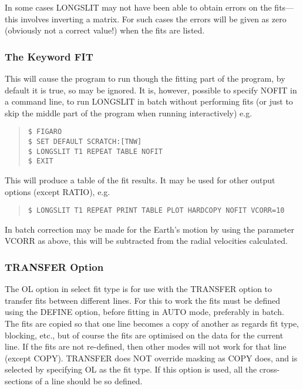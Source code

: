 In some cases LONGSLIT may not have been able to obtain errors on the
fits---this involves inverting a matrix.
For such cases the errors will be given as zero (obviously not a correct
value!) when the fits are listed.

\subsubsection{The Keyword FIT}
\label{long.fit}

This will cause the program to run though the fitting part of the
program, by default it is true, so may be ignored. It is, however,
possible to specify NOFIT in a command line, to run LONGSLIT in batch
without performing fits (or just to skip the middle part of the program
when running interactively) e.g.\
\begin{quote}\begin{verbatim}
$ FIGARO
$ SET DEFAULT SCRATCH:[TNW]
$ LONGSLIT T1 REPEAT TABLE NOFIT
$ EXIT
\end{verbatim}\end{quote}
This will produce a table of the fit results.
It may be used for other output options (except RATIO), e.g.\
\begin{quote}\begin{verbatim}
$ LONGSLIT T1 REPEAT PRINT TABLE PLOT HARDCOPY NOFIT VCORR=10
\end{verbatim}\end{quote}

  In batch correction may be made for the Earth's motion by using the
parameter VCORR as above, this will be subtracted from the radial
velocities calculated.

\subsubsection{TRANSFER Option}

The OL option in select fit type is for use with the TRANSFER option to
transfer fits between different lines. For this to work the fits must
be defined using the DEFINE option, before fitting in AUTO mode,
preferably in batch. The fits are copied so that one line becomes a
copy of another as regards fit type, blocking, etc., but of course the
fits are optimised on the data for the current line. If the fits are
not re-defined, then other modes will not work for that line (except
COPY). TRANSFER does NOT override masking as COPY does, and is selected
by specifying OL as the fit type.
If this option is used, all the cross-sections of a line should be so
defined.

